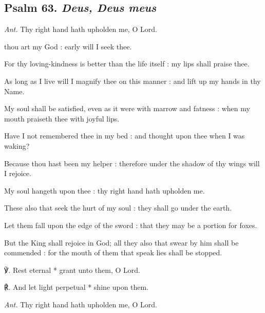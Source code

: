 \subsection{Psalm 63. \textit{Deus, Deus meus}}\par\noindent
\textit{Ant.} Thy right hand {\dag} hath upholden me, O Lord.\par
{} thou art my God : early will I seek thee.\par
{}
For thy loving-kindness is better than the life itself : my lips shall praise thee.\par
{}As long as I live will I magnify thee on this manner : and lift up my hands in thy Name.\par
{}My soul shall be satisfied, even as it were with marrow and fatness : when my mouth praiseth thee with joyful lips.\par
{}Have I not remembered thee in my bed : and thought upon thee when I was waking?\par
{}Because thou hast been my helper : therefore under the shadow of thy wings will I rejoice.\par
{}My soul hangeth upon thee : thy right hand hath upholden me.\par
{}These also that seek the hurt of my soul : they shall go under the earth.\par
{}Let them fall upon the edge of the sword : that they may be a portion for foxes.\par
{}But the King shall rejoice in God; all they also that swear by him shall be commended : for the mouth of them that speak lies shall be stopped.\par
℣. Rest eternal * grant unto them, O Lord.\par
℟. And let light perpetual * shine upon them.\par\noindent
\textit{Ant.} Thy right hand hath upholden me, O Lord.

